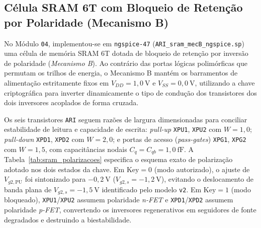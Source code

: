 \subsection{C\'{e}lula SRAM 6T com Bloqueio de Reten\c{c}\~{a}o por Polaridade (Mecanismo B)}\label{sec:met_sram}

No M\'{o}dulo \texttt{04}, implementou-se em \texttt{ngspice-47} (\texttt{ARI\_sram\_mecB\_ngspice.sp}) uma c\'{e}lula de mem\'{o}ria SRAM 6T dotada de bloqueio de reten\c{c}\~{a}o por invers\~{a}o de polaridade (\textit{Mecanismo B}). Ao contr\'{a}rio das portas l\'{o}gicas polim\'{o}rficas que permutam os trilhos de energia, o Mecanismo B mant\'{e}m os barramentos de alimenta\c{c}\~{a}o estritamente fixos em $V_{DD} = 1{,}0\ \text{V}$ e $V_{SS} = 0{,}0\ \text{V}$, utilizando a chave criptogr\'{a}fica para inverter dinamicamente o tipo de condu\c{c}\~{a}o dos transistores dos dois inversores acoplados de forma cruzada.

Os seis transistores \texttt{ARI} seguem raz\~{o}es de largura dimensionadas para conciliar estabilidade de leitura e capacidade de escrita: \textit{pull-up} \texttt{XPU1}, \texttt{XPU2} com $W = 1{,}0$; \textit{pull-down} \texttt{XPD1}, \texttt{XPD2} com $W = 2{,}0$; e portas de acesso (\textit{pass-gates}) \texttt{XPG1}, \texttt{XPG2} com $W = 1{,}5$, com capacit\^{a}ncias nodais $C_q = C_{qb} = 1{,}0\ \text{fF}$. A Tabela~\ref{tab:sram_polarizacoes} especifica o esquema exato de polariza\c{c}\~{a}o adotado nos dois estados da chave. Em $\text{Key} = 0$ (modo autorizado), o ajuste de $V_{g2,\mathrm{PU}}$ foi sintonizado para $-0{,}2\ \text{V}$ ($V_{g2,s} = -1{,}2\ \text{V}$), evitando o deslocamento de banda plana de $V_{g2,s} = -1{,}5\ \text{V}$ identificado pelo modelo \texttt{v2}. Em $\text{Key} = 1$ (modo bloqueado), \texttt{XPU1}/\texttt{XPU2} assumem polaridade \textit{n-FET} e \texttt{XPD1}/\texttt{XPD2} assumem polaridade \textit{p-FET}, convertendo os inversores regenerativos em seguidores de fonte degradados e destruindo a biestabilidade.


